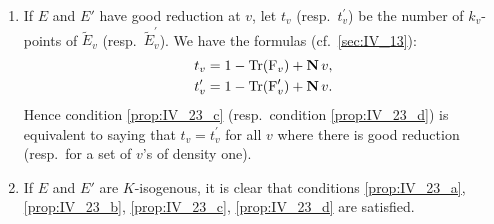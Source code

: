 \begin{obs}
	\begin{enumerate}
		\item If $E$ and $E'$ have good reduction at $v$, let $t_v$
			(resp.\ $t^\prime_v$) be the number of $k_v$-points of
			$\widetilde E_v$ (resp.\ $\widetilde E^\prime_v$). We
			have the formulas (cf.\ \ref{sec:IV_13}):
			\dpage
			\begin{align*}
				t_v        & = 1 - \operatorname{Tr}(\operatorname{F}_v) + \operatorname{\mathbf{N}} v, \\
				t^\prime_v & = 1 - \operatorname{Tr}(\operatorname{F}^\prime_v) + \operatorname{\mathbf{N}} v.
			\end{align*}
			Hence condition \ref{prop:IV_23_c} (resp.\ condition
			\ref{prop:IV_23_d}) is equivalent to saying that $t_v =
			t^\prime_v$ for all $v$ where there is good reduction
			(resp.\ for a set of $v$'s of density one).
		\item\label{rmk:IV_23_2}
			If $E$ and $E'$ are $K$-isogenous, it is clear that
			conditions \ref{prop:IV_23_a}, \ref{prop:IV_23_b},
			\ref{prop:IV_23_c}, \ref{prop:IV_23_d} are satisfied.
	\end{enumerate}
\end{obs}

